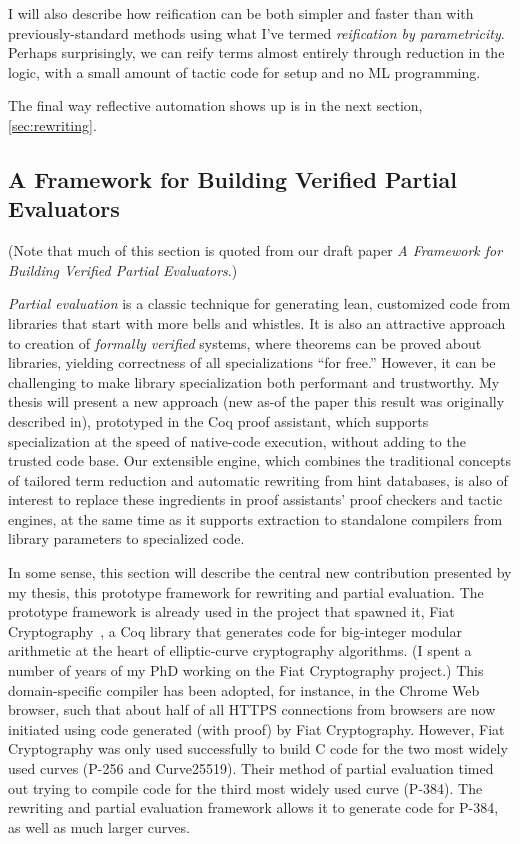 \documentclass[twoside]{article}
\begin{document}
I will also describe how reification can be both simpler and faster than with previously-standard methods using what I've termed \emph{reification by parametricity}.
Perhaps surprisingly, we can reify terms almost entirely through reduction in the logic, with a small amount of tactic code for setup and no ML programming.

The final way reflective automation shows up is in the next section, \autoref{sec:rewriting}.

\subsection{A Framework for Building Verified Partial Evaluators} \label{sec:rewriting}

(Note that much of this section is quoted from our draft paper \emph{A Framework for Building Verified Partial Evaluators}.)

\emph{Partial evaluation} is a classic technique for generating lean, customized code from libraries that start with more bells and whistles.
It is also an attractive approach to creation of \emph{formally verified} systems, where theorems can be proved about libraries, yielding correctness of all specializations ``for free.''
However, it can be challenging to make library specialization both performant and trustworthy.
My thesis will present a new approach (new as-of the paper this result was originally described in), prototyped in the Coq proof assistant, which supports specialization at the speed of native-code execution, without adding to the trusted code base.
Our extensible engine, which combines the traditional concepts of tailored term reduction and automatic rewriting from hint databases, is also of interest to replace these ingredients in proof assistants' proof checkers and tactic engines, at the same time as it supports extraction to standalone compilers from library parameters to specialized code.

In some sense, this section will describe the central new contribution presented by my thesis, this prototype framework for rewriting and partial evaluation.
The prototype framework is already used in the project that spawned it, Fiat Cryptography~\cite{FiatCryptoSP19}, a Coq library that generates code for big-integer modular arithmetic at the heart of elliptic-curve cryptography algorithms.
(I spent a number of years of my PhD working on the Fiat Cryptography project.)
This domain-specific compiler has been adopted, for instance, in the Chrome Web browser, such that about half of all HTTPS connections from browsers are now initiated using code generated (with proof) by Fiat Cryptography.
However, Fiat Cryptography was only used successfully to build C code for the two most widely used curves (P-256 and Curve25519).
Their method of partial evaluation timed out trying to compile code for the third most widely used curve (P-384).
The rewriting and partial evaluation framework allows it to generate code for P-384, as well as much larger curves.
\end{document}
